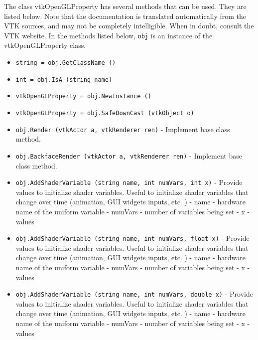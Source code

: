 The class vtkOpenGLProperty has several methods that can be used.
  They are listed below.
Note that the documentation is translated automatically from the VTK sources,
and may not be completely intelligible.  When in doubt, consult the VTK website.
In the methods listed below, \verb|obj| is an instance of the vtkOpenGLProperty class.
\begin{itemize}
\item  \verb|string = obj.GetClassName ()|

\item  \verb|int = obj.IsA (string name)|

\item  \verb|vtkOpenGLProperty = obj.NewInstance ()|

\item  \verb|vtkOpenGLProperty = obj.SafeDownCast (vtkObject o)|

\item  \verb|obj.Render (vtkActor a, vtkRenderer ren)| -  Implement base class method.

\item  \verb|obj.BackfaceRender (vtkActor a, vtkRenderer ren)| -  Implement base class method.

\item  \verb|obj.AddShaderVariable (string name, int numVars, int x)| -  Provide values to initialize shader variables.
 Useful to initialize shader variables that change over time
 (animation, GUI widgets inputs, etc. )
 -  name - hardware name of the uniform variable
 -  numVars - number of variables being set
 -  x - values

\item  \verb|obj.AddShaderVariable (string name, int numVars, float x)| -  Provide values to initialize shader variables.
 Useful to initialize shader variables that change over time
 (animation, GUI widgets inputs, etc. )
 -  name - hardware name of the uniform variable
 -  numVars - number of variables being set
 -  x - values

\item  \verb|obj.AddShaderVariable (string name, int numVars, double x)| -  Provide values to initialize shader variables.
 Useful to initialize shader variables that change over time
 (animation, GUI widgets inputs, etc. )
 -  name - hardware name of the uniform variable
 -  numVars - number of variables being set
 -  x - values

\end{itemize}
